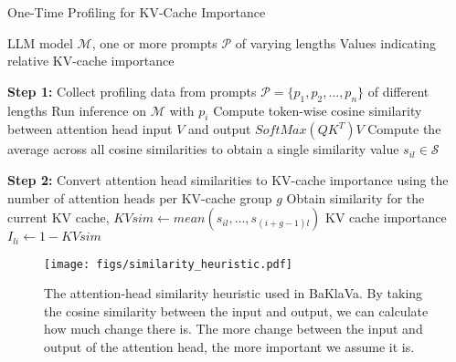 \begin{algorithm}
\caption{One-Time Profiling for KV-Cache Importance}
\begin{algorithmic}[1]
\REQUIRE LLM model $\mathcal{M}$, one or more prompts $\mathcal{P}$ of varying lengths
\ENSURE Values indicating relative KV-cache importance

\STATE \textbf{Step 1:} Collect profiling data from prompts $\mathcal{P} = \{p_1, p_2, \dots, p_n\}$ of different lengths
    \STATE Run inference on $\mathcal{M}$ with $p_i$
            \STATE Compute token-wise cosine similarity between attention head input $V$ and output $SoftMax(QK^T) V$
            \STATE Compute the average across all cosine similarities to obtain a single similarity value $s_{il} \in \mathcal{S}$
        \ENDFOR
    \ENDFOR
\ENDFOR

\STATE \textbf{Step 2:} Convert attention head similarities to KV-cache importance using the number of attention heads per KV-cache group $g$
        \STATE Obtain similarity for the current KV cache, $KVsim \gets mean(s_{il}, \dots, s_{(i+g-1)l})$ 
        \STATE KV cache importance $I_{li} \gets 1-KVsim$
    \ENDFOR
\ENDFOR

\end{algorithmic}
\label{alg:profiling}
\end{algorithm}



\begin{figure}[h]
    \centering
    \vspace{-10pt}
    \texttt{[image: figs/similarity\_heuristic.pdf]}   
    \vspace{-0.25in}  
    \caption{The attention-head similarity heuristic used in BaKlaVa. By taking the cosine similarity between the input and output, we can calculate how much change there is. The more change between the input and output of the attention head, the more important we assume it is.}
    \label{fig:dot_product_cos} 
\end{figure}

